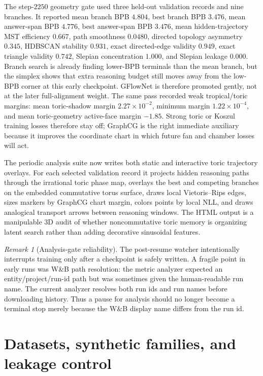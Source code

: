 \documentclass[11pt]{article}
\theoremstyle{definition}
\theoremstyle{plain}
\theoremstyle{remark}
\newtheorem{remark}[definition]{Remark}
\numberwithin{equation}{section}
\begin{document}
The step-$2250$ geometry gate used three held-out validation records and nine branches.  It reported mean branch BPB $4.804$, best branch BPB $3.476$, mean answer-span BPB $4.776$, best answer-span BPB $3.476$, mean hidden-trajectory MST efficiency $0.667$, path smoothness $0.0480$, directed topology asymmetry $0.345$, HDBSCAN stability $0.931$, exact directed-edge validity $0.949$, exact triangle validity $0.742$, Slepian concentration $1.000$, and Slepian leakage $0.000$.  Branch search is already finding lower-BPB terminals than the mean branch, but the simplex shows that extra reasoning budget still moves away from the low-BPB corner at this early checkpoint.  GFlowNet is therefore promoted gently, not at the later full-alignment weight.  The same pass recorded weak tropical/toric margins: mean toric-shadow margin $2.27\times10^{-2}$, minimum margin $1.22\times10^{-4}$, and mean toric-geometry active-face margin $-1.85$.  Strong toric or Koszul training losses therefore stay off; GraphCG is the right immediate auxiliary because it improves the coordinate chart in which future fan and chamber losses will act.

The periodic analysis suite now writes both static and interactive toric trajectory overlays.  For each selected validation record it projects hidden reasoning paths through the irrational toric phase map, overlays the best and competing branches on the embedded commutative torus surface, draws local Vietoris--Rips edges, sizes markers by GraphCG chart margin, colors points by local NLL, and draws analogical transport arrows between reasoning windows.  The HTML output is a manipulable $3$D audit of whether noncommutative toric memory is organizing latent search rather than adding decorative sinusoidal features.

\begin{remark}[Analysis-gate reliability]
The post-resume watcher intentionally interrupts training only after a checkpoint is safely written.  A fragile point in early runs was W\&B path resolution: the metric analyzer expected an entity/project/run-id path but was sometimes given the human-readable run name.  The current analyzer resolves both run ids and run names before downloading history.  Thus a pause for analysis should no longer become a terminal stop merely because the W\&B display name differs from the run id.
\end{remark}


\section{Datasets, synthetic families, and leakage control}
\end{document}
